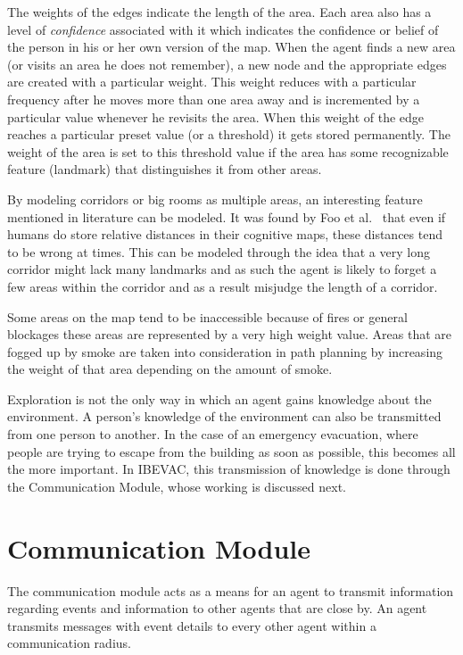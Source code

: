 The weights of the edges indicate the length of the area. Each area also has a level of \emph{confidence} associated with it which indicates the confidence or belief of the person in his or her own version of the map. When the agent finds a new area (or visits an area he does not remember), a new node and the appropriate edges are created with a particular weight. This weight reduces with a particular frequency after he moves more than one area away and is incremented by a particular value whenever he revisits the area. When this weight of the edge reaches a particular preset value (or a threshold) it gets stored permanently. The weight of the area is set to this threshold value if the area has some recognizable feature (landmark) that distinguishes it from other areas.

By modeling corridors or big rooms as multiple areas, an interesting feature mentioned in literature can be modeled. It was found by Foo et al.~\cite{Foo:2005kw} that even if humans do store relative distances in their cognitive maps, these distances tend to be wrong at times. This can be modeled through the idea that a very long corridor might lack many landmarks and as such the agent is likely to forget a few areas within the corridor and as a result misjudge the length of a corridor.

Some areas on the map tend to be inaccessible because of fires or general blockages these areas are represented by a very high weight value. Areas that are fogged up by smoke are taken into consideration in path planning by increasing the weight of that area depending on the amount of smoke.

Exploration is not the only way in which an agent gains knowledge about the environment. A person's knowledge of the environment can also be transmitted from one person to another. In the case of an emergency evacuation, where people are trying to escape from the building as soon as possible, this becomes all the more important. In IBEVAC, this transmission of knowledge is done through the Communication Module, whose working is discussed next.

\section{Communication Module}
\label{CFW:CommunicationModule}
The communication module acts as a means for an agent to transmit information regarding events and information to other agents that are close by. An agent transmits messages with event details to every other agent within a communication radius. 

